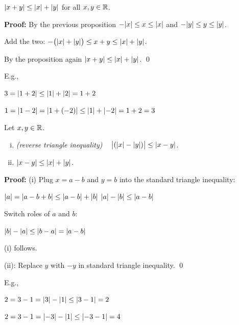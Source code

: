 \documentclass[10pt,aspectratio=149]{beamer}
\begin{document}
\begin{frame}

\begin{proposition}
$\sabs{x+y} \leq \sabs{x}+\sabs{y}$
for all $x, y \in \R$.
\end{proposition}

\pause

\textbf{Proof:}
By the previous proposition \quad
$- \sabs{x} \leq x \leq \sabs{x}$ and
$- \sabs{y} \leq y \leq \sabs{y}$.

\pause
Add the two: \quad $- \bigl(\sabs{x}+\sabs{y}\bigr) \leq x+y \leq \sabs{x}+ \sabs{y}$.

\pause
By the proposition again \quad
$\sabs{x+y} \leq \sabs{x}+\sabs{y}$.
\qed

\medskip
\pause

E.g.,

\pause
$3 = \abs{1+2} \leq \abs{1}+\abs{2} = 1+2$

\pause
$1 = \abs{1-2} = \abs{1+(-2)} \leq \abs{1}+\abs{-2} = 1+2=3$

\end{frame}

\begin{frame}

\begin{corollary}
Let $x,y \in \R$.
\begin{enumerate}[(i)]
\item \emph{(reverse triangle inequality)}
~
$\bigl\lvert (\abs{x}-\abs{y}) \bigr\rvert \leq \abs{x-y}$.
\item \pause$\abs{x-y} \leq \abs{x}+\abs{y}$.
\end{enumerate}
\end{corollary}
\pause

\textbf{Proof:}
(i) Plug $x=a-b$ and $y=b$ into the standard triangle inequality:

$\abs{a} = \abs{a-b+b} \leq \abs{a-b} + \abs{b}$
\pause
\wthus
$\abs{a}-\abs{b} \leq \abs{a-b}$

\pause
Switch roles of $a$ and $b$:

$\abs{b}-\abs{a} \leq \abs{b-a} = \abs{a-b}$

\pause
(i) follows.

\medskip
\pause

(ii): Replace $y$ with $-y$ in standard triangle inequality.
\qed

\medskip
\pause

E.g.,

$2=3-1=\abs{3}-\abs{1} \leq \abs{3-1} = 2$

\pause
$2=3-1=\abs{-3}-\abs{1} \leq \abs{-3-1} = 4$

\end{frame}
\end{document}
